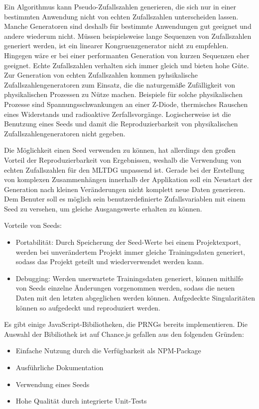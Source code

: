 Ein Algorithmus kann Pseudo-Zufallszahlen generieren, die sich nur in einer bestimmten Anwendung nicht von echten Zufallszahlen unterscheiden lassen. Manche Generatoren sind deshalb für bestimmte Anwendungen gut geeignet und andere wiederum nicht. Müssen beispielsweise lange Sequenzen von Zufallszahlen generiert werden, ist ein linearer Kongruenzgenerator nicht zu empfehlen. Hingegen wäre er bei einer performanten Generation von kurzen Sequenzen eher geeignet. Echte Zufallszahlen verhalten sich immer gleich und bieten hohe Güte. Zur Generation von echten Zufallszahlen kommen pyhsikalische Zufallszahlengeneratoren zum Einsatz, die die naturgemäße Zufälligkeit von physikalischen Prozessen zu Nütze machen. Beispiele für solche physikalischen Prozesse sind Spannungsschwankungen an einer Z-Diode, thermisches Rauschen eines Widerstands und radioaktive Zerfallsvorgänge. Logischerweise ist die Benutzung eines Seeds und damit die Reproduzierbarkeit von physikalischen Zufallszahlengeneratoren nicht gegeben.

Die Möglichkeit einen Seed verwenden zu können, hat allerdings den großen Vorteil der Reproduzierbarkeit von Ergebnissen, weshalb die Verwendung von echten Zufallszahlen für den \ac{MLTDG} unpassend ist. Gerade bei der Erstellung von komplexen Zusammenhängen innerhalb der Applikation soll ein Neustart der Generation nach kleinen Veränderungen nicht komplett neue Daten generieren. Dem Benuter soll es möglich sein benutzerdefinierte Zufallsvariablen mit einem Seed zu versehen, um gleiche Ausgangswerte erhalten zu können.

Vorteile von Seeds:
\begin{itemize}
    \item Portabilität: Durch Speicherung der Seed-Werte bei einem Projektexport, werden bei unverändertem Projekt immer gleiche Trainingsdaten generiert, sodass das Projekt geteilt und wiederverwendet werden kann. 
    \item Debugging: Werden unerwartete Trainingsdaten generiert, können mithilfe von Seeds einzelne Änderungen vorgenommen werden, sodass die neuen Daten mit den letzten abgeglichen werden können. Aufgedeckte Singularitäten können so aufgedeckt und reproduziert werden. 
\end{itemize}

Es gibt einige JavaScript-Bibiliotheken, die \ac{PRNG}s bereits implementieren. Die Auswahl der Bibiliothek ist auf Chance.js gefallen aus den folgenden Gründen:
\begin{itemize}
    \item Einfache Nutzung durch die Verfügbarkeit als NPM-Package
    \item Ausführliche Dokumentation
    \item Verwendung eines Seeds
    \item Hohe Qualität durch integrierte Unit-Tests
\end{itemize}

